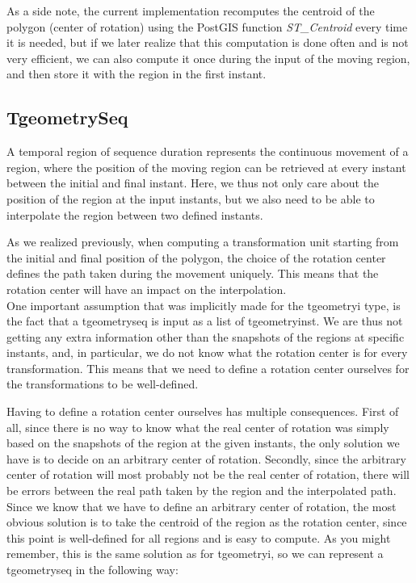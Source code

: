 As a side note, the current implementation recomputes the centroid of the polygon (center of rotation) using the PostGIS function \textit{ST\_Centroid} every time it is needed, but if we later realize that this computation is done often and is not very efficient, we can also compute it once during the input of the moving region, and then store it with the region in the first instant.

\subsection{TgeometrySeq}

A temporal region of sequence duration represents the continuous movement of a region, where the position of the moving region can be retrieved at every instant between the initial and final instant. Here, we thus not only care about the position of the region at the input instants, but we also need to be able to interpolate the region between two defined instants.

As we realized previously, when computing a transformation unit starting from the initial and final position of the polygon, the choice of the rotation center defines the path taken during the movement uniquely. This means that the rotation center will have an impact on the interpolation. \\

One important assumption that was implicitly made for the tgeometryi type, is the fact that a tgeometryseq is input as a list of tgeometryinst. We are thus not getting any extra information other than the snapshots of the regions at specific instants, and, in particular, we do not know what the rotation center is for every transformation. This means that we need to define a rotation center ourselves for the transformations to be well-defined.

Having to define a rotation center ourselves has multiple consequences. First of all, since there is no way to know what the real center of rotation was simply based on the snapshots of the region at the given instants, the only solution we have is to decide on an arbitrary center of rotation. Secondly, since the arbitrary center of rotation will most probably not be the real center of rotation, there will be errors between the real path taken by the region and the interpolated path. \\

Since we know that we have to define an arbitrary center of rotation, the most obvious solution is to take the centroid of the region as the rotation center, since this point is well-defined for all regions and is easy to compute. As you might remember, this is the same solution as for tgeometryi, so we can represent a tgeometryseq in the following way:


